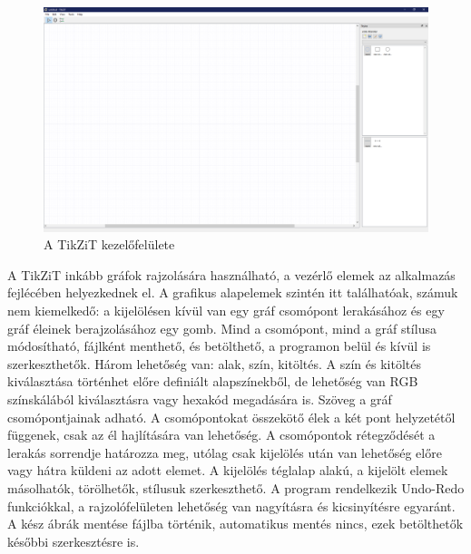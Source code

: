 \begin{figure}[!h]
	\includegraphics[width=\textwidth]{images/tikzit.png}
	\caption{A TikZiT kezelőfelülete}
	\label{fig:tikzit}
\end{figure}
A TikZiT inkább gráfok rajzolására használható, a vezérlő elemek az alkalmazás fejlécében helyezkednek el. A grafikus alapelemek szintén itt találhatóak, számuk nem kiemelkedő: a kijelölésen kívül van egy gráf csomópont lerakásához és egy gráf éleinek berajzolásához egy gomb. Mind a csomópont, mind a gráf stílusa módosítható, fájlként menthető, és betölthető, a programon belül és kívül is szerkeszthetők. Három lehetőség van: alak, szín, kitöltés. A szín és kitöltés kiválasztása történhet előre definiált alapszínekből, de lehetőség van RGB színskálából kiválasztásra vagy hexakód megadására is. Szöveg a gráf csomópontjainak adható. A csomópontokat összekötő élek a két pont helyzetétől függenek, csak az él hajlítására van lehetőség. A csomópontok rétegződését a lerakás sorrendje határozza meg, utólag csak kijelölés után van lehetőség előre vagy hátra küldeni az adott elemet. A kijelölés téglalap alakú, a kijelölt elemek másolhatók, törölhetők, stílusuk szerkeszthető.  A program rendelkezik Undo-Redo funkciókkal, a rajzolófelületen lehetőség van nagyításra és kicsinyítésre egyaránt. A kész ábrák mentése fájlba történik, automatikus mentés nincs, ezek betölthetők későbbi szerkesztésre is. 

